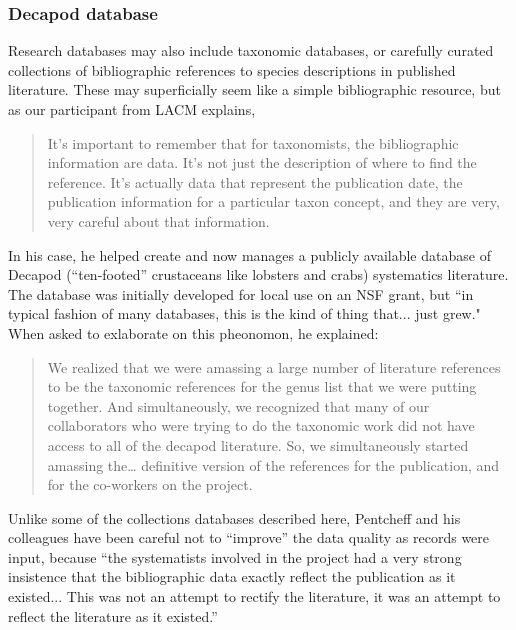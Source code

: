 \subsubsection{Decapod database}
Research databases may also include taxonomic databases, or carefully curated collections of bibliographic references to species descriptions in published literature. These may superficially seem like a simple bibliographic resource, but as our participant from LACM explains,
\begin{quote}
It’s important to remember that for taxonomists, the bibliographic information are data. It's not just the description of where to find the reference. It's actually data that represent the publication date, the publication information for a particular taxon concept, and they are very, very careful about that information.
\end{quote}
In his case, he helped create and now manages a publicly available database of Decapod (“ten-footed” crustaceans like lobsters and crabs) systematics literature. The database was initially developed for local use on an NSF grant, but “in typical fashion of many databases, this is the kind of thing that... just grew." When asked to exlaborate on this pheonomon, he explained:
\begin{quote}
We realized that we were amassing a large number of literature references to be the taxonomic references for the genus list that we were putting together. And simultaneously, we recognized that many of our collaborators who were trying to do the taxonomic work did not have access to all of the decapod literature. So, we simultaneously started amassing the… definitive version of the references for the publication, and for the co-workers on the project.
\end{quote}
Unlike some of the collections databases described here, Pentcheff and his colleagues have been careful not to “improve” the data quality as records were input, because “the systematists involved in the project had a very strong insistence that the bibliographic data exactly reflect the publication as it existed... This was not an attempt to rectify the literature, it was an attempt to reflect the literature as it existed.” 

